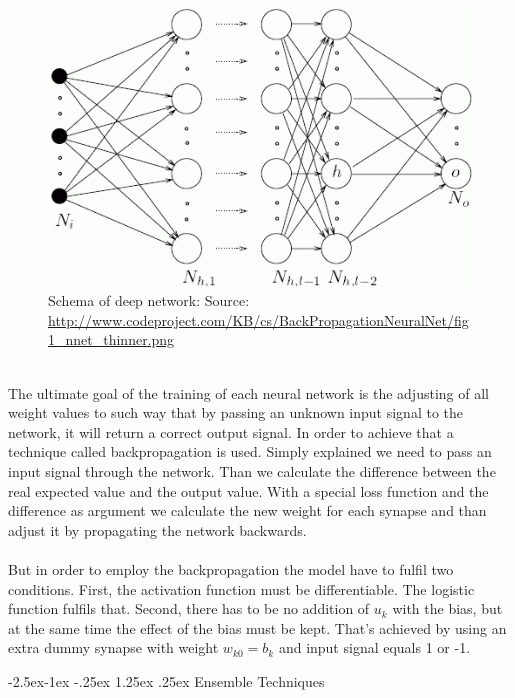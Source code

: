 \documentclass[runningheads,a4paper]{llncs}[2015/06/24]
\makeatletter
\renewcommand\paragraph{\@startsection{paragraph}{4}{\z@}%
            {-2.5ex\@plus -1ex \@minus -.25ex}%
            {1.25ex \@plus .25ex}%
            {\normalfont\normalsize\bfseries}}
\makeatother
\begin{document}
\begin{figure}[h]
\centering
\includegraphics[width=\textwidth]{deepNetwork}
\caption{Schema of deep network: Source: \url{http://www.codeproject.com/KB/cs/BackPropagationNeuralNet/fig1_nnet_thinner.png}}
\label{fig:deepNetwork}
\end{figure}  
  
\hspace{1cm}\\ The ultimate goal of the training of each neural network is the adjusting of all weight values to such way that by passing an unknown input signal to the network, it will return a correct output signal. In order to achieve that a technique called backpropagation is used. Simply explained we need to pass an input signal through the network. Than we calculate the difference between the real expected value and the output value. With a special loss function and the difference as argument we calculate the new weight for each synapse and than adjust it by propagating the network backwards\cite{rumelhart1986learning}.\\\\ But in order to employ the backpropagation the model have to fulfil two conditions. First, the activation function must be differentiable. The logistic function fulfils that. Second, there has to be no addition of $u_k$ with the bias, but at the same time the effect of the bias must be kept. That's achieved by using an extra dummy synapse with weight $w_{k0} = b_k$ and input signal equals 1 or -1\cite{haykin2009neural}.

		 \paragraph{Ensemble Techniques}
\end{document}

